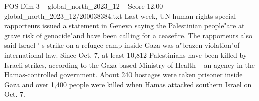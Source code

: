 \begin{textsample}{POS Dim 3 – global\_north\_2023\_12 – Score 12.00 – global\_north\_2023\_12/200038384.txt}
Last week, UN human rights special rapporteurs issued a statement in Geneva saying the Palestinian people"are at grave risk of genocide"and have been calling for a ceasefire.
The rapporteurs also said Israel ' s strike on a refugee camp inside Gaza was a"brazen violation"of international law.
Since Oct. 7, at least 10,812 Palestinians have been killed by Israeli strikes, according to the Gaza-based Ministry of Health -- an agency in the Hamas-controlled government.
About 240 hostages were taken prisoner inside Gaza and over 1,400 people were killed when Hamas attacked southern Israel on Oct. 7.

\end{textsample}
